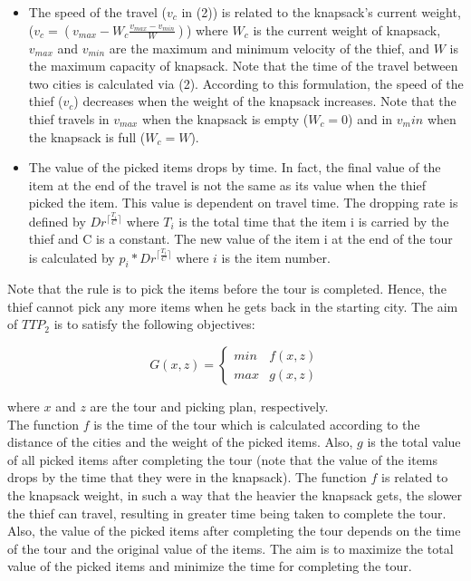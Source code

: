 \documentclass[twocolumn]{IEEEtran}
\begin{document}
\begin{itemize}
    \item The speed of the travel ($v_c$ in (2)) is related to the
    knapsack’s current weight, 
    ($v_c = (v_{max} - W_c \frac{v_{max}-v_{min}}{W})$)
    where $W_c$ is the current weight of knapsack, $v_{max}$ and $v_{min}$
    are the maximum and minimum velocity of the thief, and
    $W$ is the maximum capacity of knapsack. Note that the
    time of the travel between two cities is calculated via (2).
    According to this formulation, the speed of the thief ($v_c$)
    decreases when the weight of the knapsack increases. Note
    that the thief travels in $v_{max}$ when the knapsack is empty
    ($W_c=0$) and in $v_min$ when the knapsack is full ($W_c=W$).

    \item The value of the picked items drops by time.
    In fact, the final value of the item at the end of the travel is not the
    same as its value when the thief picked the item. This
    value is dependent on travel time. The dropping rate is
    defined by $Dr^{\lceil \frac{T_i}{C} \rceil}$ where $T_i$ is the total time that the item i
    is carried by the thief and C is a constant. The new value
    of the item i at the end of the tour is calculated by 
    $p_i*Dr^{\lceil \frac{T_i}{C} \rceil}$ where $i$ is the item number. \\
\end{itemize}

Note that the rule is to pick the items before the tour is
completed. Hence, the thief cannot pick any more items when
he gets back in the starting city. The aim of $TTP_2$ is to satisfy
the following objectives:

\begin{equation}
    G(x,z) =
\left\{
	\begin{array}{ll}
		min & f(x,z)  \\
		max & g(x,z)
	\end{array}
\right.
\end{equation}

where $x$ and $z$ are the tour and picking plan, respectively. \\

The function $f$ is the time of the tour which is calculated
according to the distance of the cities and the weight of the
picked items. Also, $g$ is the total value of all picked items after
completing the tour (note that the value of the items drops by
the time that they were in the knapsack). The function $f$ is
related to the knapsack weight, in such a way that the heavier
the knapsack gets, the slower the thief can travel, resulting in
greater time being taken to complete the tour. Also, the value
of the picked items after completing the tour depends on the
time of the tour and the original value of the items. The aim is
to maximize the total value of the picked items and minimize
the time for completing the tour. 
\end{document}
